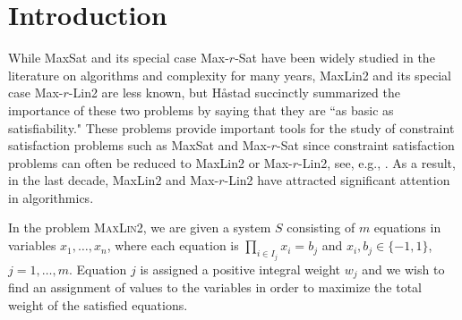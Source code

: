 \documentclass{llncs}
\begin{document}
\pagestyle{plain}

\section{Introduction}\label{section:intro}


While {\sc MaxSat} and its special case {\sc Max-$r$-Sat} have been widely studied in the literature
on algorithms and complexity for many years, {\sc MaxLin2} and its special case {\sc Max-$r$-Lin2} are less known,
but H\aa stad  \cite{Hastad01} succinctly summarized the importance of these two problems by saying that they are
``as basic as satisfiability." These problems provide important tools for the study of constraint satisfaction problems
such as {\sc MaxSat} and {\sc Max-$r$-Sat} since constraint satisfaction problems can often be reduced to {\sc MaxLin2}
or {\sc Max-$r$-Lin2}, see, e.g., \cite{AloGutKimSzeYeo11,AloGutKri04,CroGutJon10,CroGutJonKimRuz10,Hastad01,KimWil}.
As a result, in the last decade, {\sc MaxLin2} and {\sc Max-$r$-Lin2} have attracted significant attention in  algorithmics.

In the problem \textsc{MaxLin2}, we are given a system $S$ consisting of
$m$ equations in variables $x_1,\ldots ,x_n$, where each equation is $\prod_{i \in I_j}x_i = b_j$ and
$x_i,b_j \in \{-1, 1\}$, $j=1,\ldots ,m$.
Equation $j$ is assigned a positive integral weight $w_j$ and we wish to find an assignment of
values to the variables in order to maximize the total weight of the satisfied equations.
\end{document}
